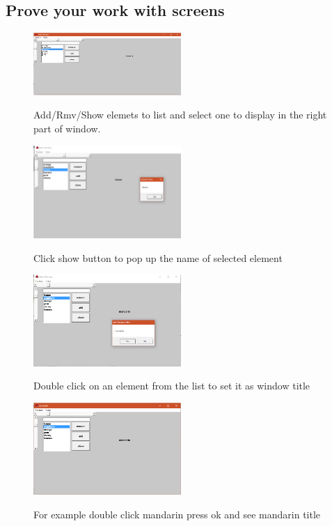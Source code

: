 \subsection{Prove your work with screens}

\begin{figure}[h!]
  \centering
    {%
      \includegraphics[width=0.5\textwidth]{1}}
  \caption{Add/Rmv/Show elemets to list and select one to display in the right part of window.}
\end{figure}

\begin{figure}[h!]
  \centering
    {%
      \includegraphics[width=0.5\textwidth]{2}}
  \caption{Click show button to pop up the name of selected element}
\end{figure}

\begin{figure}[h!]
  \centering
    {%
      \includegraphics[width=0.5\textwidth]{3}}
  \caption{Double click on an element from the list to set it as window title}
\end{figure}

\begin{figure}[h!]
  \centering
    {%
      \includegraphics[width=0.5\textwidth]{4}}
  \caption{For example double click mandarin press ok and see mandarin title}
\end{figure}

